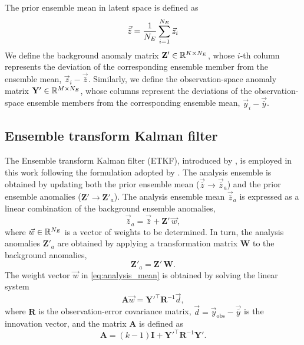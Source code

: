 The prior ensemble mean in latent space is defined as
%
\begin{equation}
\vec{\bar{z}} = \frac{1}{N_E}\sum_{i=1}^{N_E}\vec{z}_i
\end{equation}
%
We define the background anomaly matrix $\mathbf{Z'} \in \mathbb{R}^{K \times N_E}$, whose $i$-th column represents the deviation of the corresponding ensemble member from the ensemble mean, $\vec{z}_i - \vec{\bar{z}}$. Similarly, we define the observation-space anomaly matrix $\mathbf{Y'} \in \mathbb{R}^{M \times N_E}$, whose columns represent the deviations of the observation-space ensemble members from the corresponding ensemble mean, $\vec{y}_i - \vec{\bar{y}}$.
%
%
\subsection{Ensemble transform Kalman filter} \label{sec:etkf}
The Ensemble transform Kalman filter (ETKF), introduced by \cite{bishop2001}, is employed in this work following the formulation adopted by \cite{hunt2007}. The analysis ensemble is obtained by updating both the prior ensemble mean ($\vec{\bar{z}} \to \vec{\bar{z}}_a$) and the prior ensemble anomalies ($\mathbf{Z'} \to \mathbf{Z'}_a$). The analysis ensemble mean $\vec{\bar{z}}_a$ is expressed as a linear combination of the background ensemble anomalies,
%
\begin{equation}
\vec{\bar{z}}_a = \vec{\bar{z}} + \mathbf{Z'}\,\vec{w},
\label{eq:analysis_mean}
\end{equation}
%
where $\vec{w} \in \mathbb{R}^{N_E}$ is a vector of weights to be determined. In turn, the analysis anomalies $\mathbf{Z'}_a$ are obtained by applying a transformation matrix $\mathbf{W}$ to the background anomalies,
%
\begin{equation}
\mathbf{Z'}_a = \mathbf{Z'}\,\mathbf{W}.
\label{eq:analysis_anomalies}
\end{equation}
%
The weight vector $\vec{w}$ in \eqref{eq:analysis_mean} is obtained by
solving the linear system
\begin{equation}
\mathbf{A}\vec{w} = \mathbf{Y'}^\intercal\mathbf{R}^{-1}\vec{d},
\end{equation}
where $\mathbf{R}$ is the observation-error covariance matrix, $\vec{d} = \vec{y}_{\mathrm{obs}}-\vec{\bar{y}}$ is the innovation vector, and the matrix $\mathbf{A}$ is defined as
%
\begin{equation}
\mathbf{A} = (k-1)\mathbf{I} + \mathbf{Y'}^\intercal\mathbf{R}^{-1}\mathbf{Y'}.
\end{equation}
